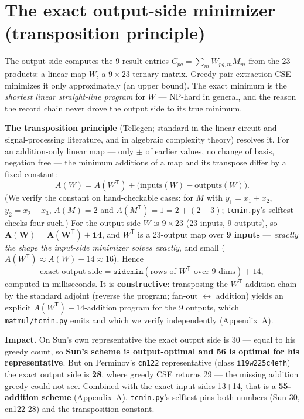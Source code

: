 \documentclass[10pt]{article}
\newcommand{\WT}{\ensuremath{W^{\mathsf T}}}
\begin{document}
\section{The exact output-side minimizer (transposition
principle)}\label{sec:out}

The output side computes the 9 result entries $C_{pq} = \sum_m
W_{pq,m} M_m$ from the 23 products: a linear map $W$, a $9\times23$
ternary matrix. Greedy pair-extraction CSE minimizes it only
approximately (an upper bound). The exact minimum is the \emph{shortest
linear straight-line program} for $W$ --- NP-hard in general, and the
reason the record chain never drove the output side to its true
minimum.

\textbf{The transposition principle} (Tellegen; standard in the
linear-circuit and signal-processing literature, and in algebraic
complexity theory) resolves it. For an addition-only linear map ---
only $\pm$ of earlier values, no change of basis, negation free --- the
minimum additions of a map and its transpose differ by a fixed
constant:
\[
  A(W) = A(\WT) + \bigl(\mathrm{inputs}(W) - \mathrm{outputs}(W)\bigr).
\]
(We verify the constant on hand-checkable cases: for $M$ with
$y_1=x_1{+}x_2$, $y_2=x_2{+}x_3$, $A(M)=2$ and $A(M^{\mathsf T})=1 =
2+(2-3)$; \texttt{tcmin.py}'s selftest checks four such.) For the output
side $W$ is $9\times23$ (23 inputs, 9 outputs), so $\mathbf{A(W) =
A(\WT) + 14}$, and \WT{} is a 23-output map over \textbf{9 inputs} ---
\emph{exactly the shape the input-side minimizer solves exactly}, and
small ($A(\WT) \approx A(W) - 14 \approx 16$). Hence
\[
  \text{exact output side} = \texttt{sidemin}(\text{rows of }\WT
  \text{ over 9 dims}) + 14,
\]
computed in milliseconds. It is \textbf{constructive}: transposing the
\WT{} addition chain by the standard adjoint (reverse the program;
fan-out $\leftrightarrow$ addition) yields an explicit
$A(\WT){+}14$-addition program for the 9 outputs, which
\texttt{matmul/tcmin.py} emits and which we verify independently
(Appendix~A).

\textbf{Impact.} On Sun's own representative the exact output side is
30 --- equal to his greedy count, so \textbf{Sun's scheme is
output-optimal and 56 is optimal for his representative}. But on
Perminov's \texttt{cn122} representative (class \texttt{i19w225c4efh})
the exact output side is \textbf{28}, where greedy CSE returns 29 ---
the missing addition greedy could not see. Combined with the exact
input sides 13+14, that is a \textbf{55-addition scheme}
(Appendix~A). \texttt{tcmin.py}'s selftest pins both numbers (Sun 30,
cn122 28) and the transposition constant.
\end{document}
